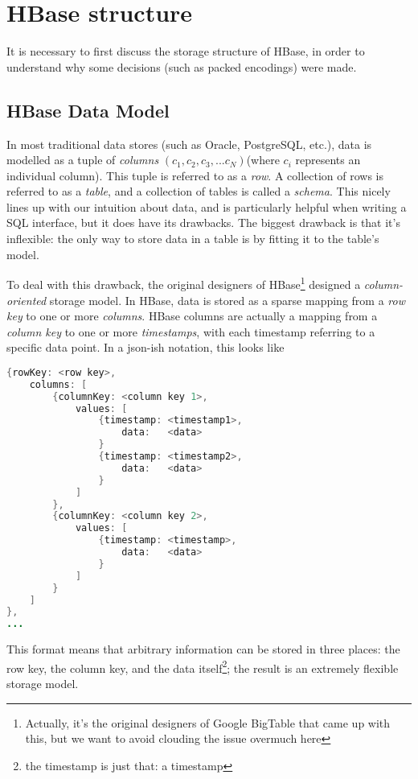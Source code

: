 \section{HBase structure}
It is necessary to first discuss the storage structure of HBase, in order to understand why some decisions (such as packed encodings) were made.

\subsection{HBase Data Model}
In most traditional data stores (such as Oracle, PostgreSQL, etc.), data is modelled as a tuple of \emph{columns} $(c_1,c_2,c_3,...c_N)$(where $c_i$ represents an individual column). This tuple is referred to as a \emph{row}. A collection of rows is referred to as a \emph{table}, and a collection of tables is called a \emph{schema}. This nicely lines up with our intuition about data, and is particularly helpful when writing a SQL interface, but it does have its drawbacks. The biggest drawback is that it's inflexible: the only way to store data in a table is by fitting it to the table's model. 

To deal with this drawback, the original designers of HBase\footnote{Actually, it's the original designers of Google BigTable that came up with this, but we want to avoid clouding the issue overmuch here} designed a \emph{column-oriented} storage model. In HBase, data is stored as a sparse mapping from a \emph{row key} to one or more \emph{columns}. HBase columns are actually a mapping from a \emph{column key} to one or more \emph{timestamps}, with each timestamp referring to a specific data point. In a json-ish notation, this looks like

\begin{minipage}{\linewidth}
\begin{lstlisting}[frame=single,language=java,captionpos=b,caption=HBase data model]
{rowKey: <row key>,
	columns: [
		{columnKey: <column key 1>,
			values: [
				{timestamp: <timestamp1>,
					data:	<data>
				}
				{timestamp: <timestamp2>,
					data:	<data>
				}
			]	
		},		
		{columnKey: <column key 2>,
			values: [
				{timestamp: <timestamp>,
					data:	<data>
				}
			]	
		}		
	]
},
...
\end{lstlisting}
\end{minipage}

This format means that arbitrary information can be stored in three places: the row key, the column key, and the data itself\footnote{the timestamp is just that: a timestamp}; the result is an extremely flexible storage model.

